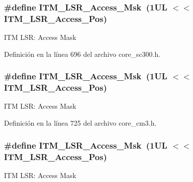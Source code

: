 \subsubsection[{\texorpdfstring{I\+T\+M\+\_\+\+L\+S\+R\+\_\+\+Access\+\_\+\+Msk}{ITM_LSR_Access_Msk}}]{\setlength{\rightskip}{0pt plus 5cm}\#define I\+T\+M\+\_\+\+L\+S\+R\+\_\+\+Access\+\_\+\+Msk~(1\+U\+L $<$$<$ I\+T\+M\+\_\+\+L\+S\+R\+\_\+\+Access\+\_\+\+Pos)}\hypertarget{group___c_m_s_i_s___i_t_m_gac8ae69f11c0311da226c0c8ec40b3d37}{}\label{group___c_m_s_i_s___i_t_m_gac8ae69f11c0311da226c0c8ec40b3d37}
I\+TM L\+SR\+: Access Mask 

Definición en la línea 696 del archivo core\+\_\+sc300.\+h.

\subsubsection[{\texorpdfstring{I\+T\+M\+\_\+\+L\+S\+R\+\_\+\+Access\+\_\+\+Msk}{ITM_LSR_Access_Msk}}]{\setlength{\rightskip}{0pt plus 5cm}\#define I\+T\+M\+\_\+\+L\+S\+R\+\_\+\+Access\+\_\+\+Msk~(1\+U\+L $<$$<$ I\+T\+M\+\_\+\+L\+S\+R\+\_\+\+Access\+\_\+\+Pos)}\hypertarget{group___c_m_s_i_s___i_t_m_gac8ae69f11c0311da226c0c8ec40b3d37}{}\label{group___c_m_s_i_s___i_t_m_gac8ae69f11c0311da226c0c8ec40b3d37}
I\+TM L\+SR\+: Access Mask 

Definición en la línea 725 del archivo core\+\_\+cm3.\+h.

\subsubsection[{\texorpdfstring{I\+T\+M\+\_\+\+L\+S\+R\+\_\+\+Access\+\_\+\+Msk}{ITM_LSR_Access_Msk}}]{\setlength{\rightskip}{0pt plus 5cm}\#define I\+T\+M\+\_\+\+L\+S\+R\+\_\+\+Access\+\_\+\+Msk~(1\+U\+L $<$$<$ I\+T\+M\+\_\+\+L\+S\+R\+\_\+\+Access\+\_\+\+Pos)}\hypertarget{group___c_m_s_i_s___i_t_m_gac8ae69f11c0311da226c0c8ec40b3d37}{}\label{group___c_m_s_i_s___i_t_m_gac8ae69f11c0311da226c0c8ec40b3d37}
I\+TM L\+SR\+: Access Mask 

